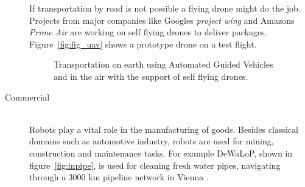 \begin{description}
If transportation by road is not possible a flying drone might do the job. Projects from major companies like Googles \emph{project wing} and Amazons \emph{Prime Air} are working on self flying drones to deliver packages. 
Figure~\ref{fig:fig_uav} shows a prototype drone on a test flight. 

\begin{figure}[thpb]
	  \myfloatalign
      \footnotesize
      \centering
   \caption[Logistic robots]{Transportation on earth using Automated Guided Vehicles and in the air with the support of self flying drones.}
   \label{fig:fig_transport}
\end{figure}

\item[Commercial]\hfill \\
Robots play a vital role in the manufacturing of goods. Besides classical domains such as  automotive industry, robots are used for mining, construction and maintenance tasks. 
For example DeWaLoP, shown in figure~\ref{fig:inpipe}, is used for cleaning fresh water pipes, navigating through a 3000 km pipeline network in Vienna \cite{mateos2013inpipe}.   


\end{description}
